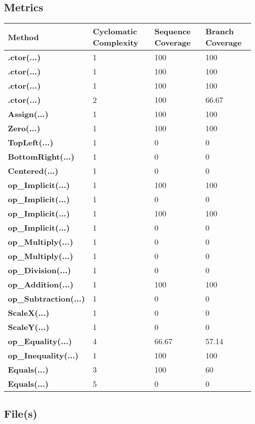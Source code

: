 \documentclass[a4paper,10pt]{article}
\begin{document}
\subsection{Metrics}
\begin{longtable}[l]{|l|l|l|l|}
\hline
\textbf{Method} & \textbf{Cyclomatic Complexity} & \textbf{Sequence Coverage} & \textbf{Branch Coverage}\\
\hline
\textbf{.ctor(...)} & 1 & 100 & 100\\
\hline
\textbf{.ctor(...)} & 1 & 100 & 100\\
\hline
\textbf{.ctor(...)} & 1 & 100 & 100\\
\hline
\textbf{.ctor(...)} & 2 & 100 & 66.67\\
\hline
\textbf{Assign(...)} & 1 & 100 & 100\\
\hline
\textbf{Zero(...)} & 1 & 100 & 100\\
\hline
\textbf{TopLeft(...)} & 1 & 0 & 0\\
\hline
\textbf{BottomRight(...)} & 1 & 0 & 0\\
\hline
\textbf{Centered(...)} & 1 & 0 & 0\\
\hline
\textbf{op\_Implicit(...)} & 1 & 100 & 100\\
\hline
\textbf{op\_Implicit(...)} & 1 & 0 & 0\\
\hline
\textbf{op\_Implicit(...)} & 1 & 100 & 100\\
\hline
\textbf{op\_Implicit(...)} & 1 & 0 & 0\\
\hline
\textbf{op\_Multiply(...)} & 1 & 0 & 0\\
\hline
\textbf{op\_Multiply(...)} & 1 & 0 & 0\\
\hline
\textbf{op\_Division(...)} & 1 & 0 & 0\\
\hline
\textbf{op\_Addition(...)} & 1 & 100 & 100\\
\hline
\textbf{op\_Subtraction(...)} & 1 & 0 & 0\\
\hline
\textbf{ScaleX(...)} & 1 & 0 & 0\\
\hline
\textbf{ScaleY(...)} & 1 & 0 & 0\\
\hline
\textbf{op\_Equality(...)} & 4 & 66.67 & 57.14\\
\hline
\textbf{op\_Inequality(...)} & 1 & 100 & 100\\
\hline
\textbf{Equals(...)} & 3 & 100 & 60\\
\hline
\textbf{Equals(...)} & 5 & 0 & 0\\
\hline
\end{longtable}
\subsection{File(s)}
\end{document}
